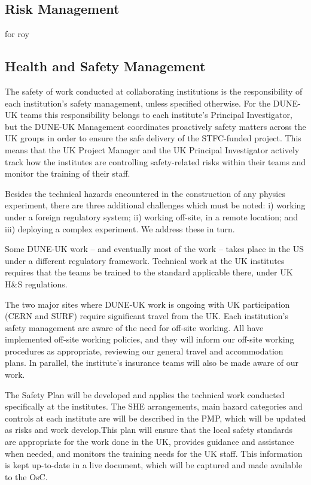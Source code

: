 \subsection{Risk Management}
for roy

\subsection{Health and Safety Management}

The safety of work conducted at collaborating institutions is the responsibility of each institution’s safety management, unless specified otherwise. For the DUNE-UK teams this responsibility belongs to each institute’s Principal Investigator, but the DUNE-UK Management coordinates proactively safety matters across the UK groups in order to ensure the safe delivery of the STFC-funded project. This means that the UK Project Manager and the UK Principal Investigator actively track how the institutes are controlling safety-related risks within their teams and monitor the training of their staff.

Besides the technical hazards encountered in the construction of any physics experiment, there are three additional challenges which must be noted: i) working under a foreign regulatory system; ii) working off-site, in a remote location; and iii) deploying a complex experiment. 
We address these in turn.

Some DUNE-UK work – and eventually most of the work – takes place in the US under a different regulatory framework. Technical work at the UK institutes requires that the teams be trained to the standard applicable there, under UK H\&S regulations.

The two major sites where DUNE-UK work is ongoing with UK participation (CERN and SURF) require significant travel from the UK. Each institution’s safety management are aware of the need for off-site working. All have implemented off-site working policies, and they will inform our off-site working procedures as appropriate, reviewing our general travel and accommodation plans. In parallel, the institute’s insurance teams will also be made aware of our work.

The Safety Plan will be developed and  applies the technical work conducted specifically at the institutes. The SHE arrangements, main hazard categories and controls at each institute are will be described in the PMP, which will be updated as risks and work develop.This plan will ensure that the local safety standards are appropriate for the work done in the UK, provides guidance and assistance when needed, and monitors the training needs for the UK staff. This information is kept up-to-date in a live document, which will be captured and made available to the OsC.

